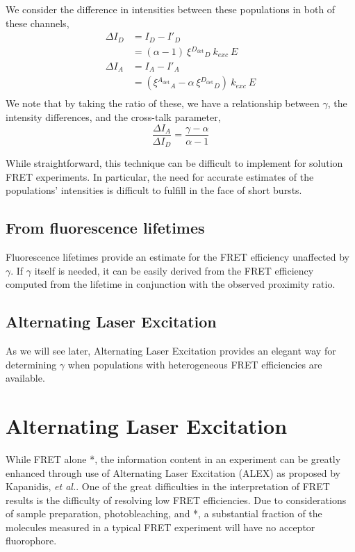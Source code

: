 \documentclass{article}
\newcommand{\dt}[1]{\ensuremath{^{#1_\mathrm{det}}}}   %
\begin{document}
We consider the difference in intensities between these populations
in both of these channels,
\begin{align*}
  \Delta I_D
  & = I_D - I'_D \\
  & = (\alpha - 1) ~ \xi\dt{D}_D ~ k_{exc} ~ E \\
  \Delta I_A
  & = I_A - I'_A \\
  & = (\xi\dt{A}_A - \alpha~\xi\dt{D}_D) ~ k_{exc} ~ E \\
\end{align*}
We note that by taking the ratio of these, we have a relationship between
$\gamma$, the intensity differences, and the cross-talk parameter,
\begin{equation}
  \frac{\Delta I_A}{\Delta I_D} = \frac{\gamma - \alpha}{\alpha - 1}
\end{equation}

While straightforward, this technique can be difficult to implement
for solution FRET experiments. In particular, the need for accurate
estimates of the populations' intensities is difficult to fulfill in
the face of short bursts.

\subsection{From fluorescence lifetimes}

Fluorescence lifetimes provide an estimate for the FRET efficiency
unaffected by $\gamma$. If $\gamma$ itself is needed, it can be easily
derived from the FRET efficiency computed from the lifetime in
conjunction with the observed proximity ratio.

\subsection{Alternating Laser Excitation}

As we will see later, Alternating Laser Excitation provides an elegant 
way for determining $\gamma$ when populations with heterogeneous FRET
efficiencies are available.

\section{Alternating Laser Excitation}
While FRET alone *, the information content in an experiment can be
greatly enhanced through use of Alternating Laser Excitation (ALEX) as
proposed by Kapanidis, {\it et al.}\cite{Kapanidis2005}. One of the
great difficulties in the interpretation of FRET results is the
difficulty of resolving low FRET efficiencies. Due to considerations
of sample preparation, photobleaching, and *, a substantial fraction
of the molecules measured in a typical FRET experiment will have no
acceptor fluorophore.
\end{document}
